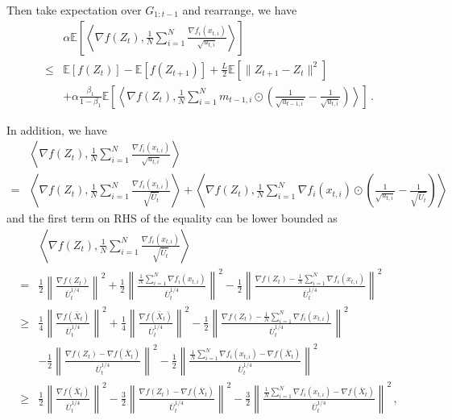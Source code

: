\documentclass[anon,12pt]{colt2021} %
\begin{document}
Then take expectation over $G_{1:t-1}$ and rearrange, we have 
\begin{align}\label{eq: exp_lip}
& \alpha  \mathbb E\left[\left \langle \nabla f( Z_{t}), \frac{1}{N} \sum_{i=1}^N \frac{\nabla f_i(x_{t,i})}{\sqrt{u_{t,i}}}  \right \rangle \right]\\
\leq & \mathbb E  [f( Z_{t})]  -  \mathbb E [f( Z_{t+1})] + \frac{L}{2} \mathbb E\left[\| Z_{t+1}-  Z_{t}\|^2 \right] \nonumber  \\
&+ \alpha \frac{\beta_1}{1-\beta_1}  \mathbb E \left [\left \langle \nabla f( Z_{t}) , \frac{1}{N} \sum_{i=1}^N m_{t-1	,i} \odot (\frac{1}{\sqrt{u_{t-1,i}}} - \frac{1}{\sqrt{u_{t,i}}}) \right \rangle \right] \, .
\end{align}

In addition, we have 
\begin{align}\label{eq: u_to_u_bar}
&\left \langle \nabla f( Z_{t}), \frac{1}{N} \sum_{i=1}^N \frac{\nabla f_i(x_{t,i})}{\sqrt{u_{t,i}}}  \right \rangle  \nonumber \\
= &  \left \langle \nabla f( Z_{t}), \frac{1}{N} \sum_{i=1}^N \frac{\nabla f_i( x_{t,i})}{\sqrt{\overline U_{t}}}  \right \rangle  +\left \langle \nabla f( Z_{t}), \frac{1}{N} \sum_{i=1}^N \nabla f_i( x_{t,i})\odot \left(\frac{1}{\sqrt{u_{t,i}}} - \frac{1}{\sqrt{\overline U_{t}}}  \right)  \right \rangle 
\end{align}
and the first term on RHS of the equality can be lower bounded as 
\begin{align} \label{eq: split_1}
&\left \langle \nabla f( Z_{t}), \frac{1}{N} \sum_{i=1}^N \frac{\nabla f_i( x_{t,i})}{\sqrt{\overline U_{t}}}  \right \rangle \nonumber \\
= &\frac{1}{2} \left\|\frac{\nabla f( Z_{t})}{\overline U_{t}^{1/4}}\right\|^2 + \frac{1}{2}\left\|  \frac{\frac{1}{N}\sum_{i=1}^N \nabla f_i( x_{t,i}) }{\overline U_{t}^{1/4}}  \right\|^2 - \frac{1}{2 }\left\| \frac{\nabla f( Z_{t}) -\frac{1}{N}\sum_{i=1}^N \nabla f_i( x_{t,i})}{\overline U_{t}^{1/4}} \right\|^2 \nonumber \\
\geq & \frac{1}{4} \left\|\frac{\nabla f( \overline X_{t})}{\overline U_{t}^{1/4}}\right\|^2 + \frac{1}{4}\left\|  \frac{ \nabla f( \overline X_{t})}{\overline U_{t}^{1/4}}  \right\|^2 - \frac{1}{2 }\left\| \frac{\nabla f( Z_{t}) -\frac{1}{N}\sum_{i=1}^N \nabla f_i( x_{t,i})}{\overline U_{t}^{1/4}} \right\|^2  \nonumber \\
&- \frac{1}{2} \left\|\frac{\nabla f( Z_{t}) -\nabla f( \overline X_{t})}{\overline U_{t}^{1/4}}\right\|^2 - \frac{1}{2} \left\|  \frac{ \frac{1}{N}\sum_{i=1}^N \nabla f_i( x_{t,i}) -  \nabla f( \overline X_{t})}{\overline U_{t}^{1/4}}  \right\|^2 \nonumber \\
\geq & \frac{1}{2} \left\|\frac{\nabla f( \overline X_{t})}{\overline U_{t}^{1/4}}\right\|^2   - \frac{3}{2} \left\|\frac{\nabla f( Z_{t}) -\nabla f( \overline X_{t})}{\overline U_{t}^{1/4}}\right\|^2 - \frac{3}{2} \left\|  \frac{ \frac{1}{N}\sum_{i=1}^N \nabla f_i( x_{t,i}) -  \nabla f( \overline X_{t})}{\overline U_{t}^{1/4}}  \right\|^2 \, ,
\end{align}
\end{document}
